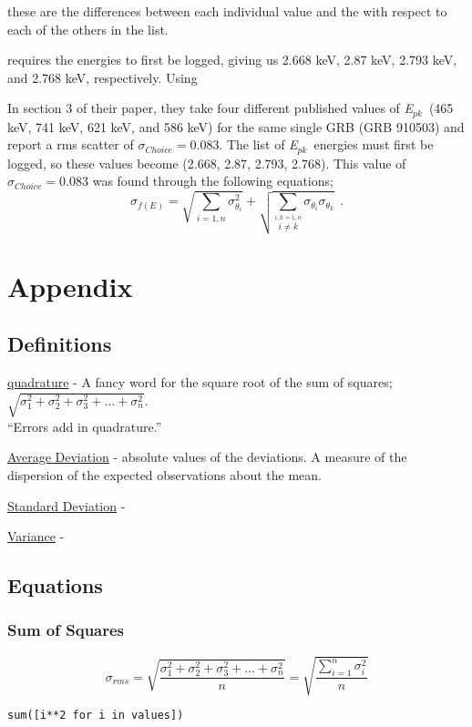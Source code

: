 \documentclass[11pt, oneside]{article}   	%
\newcommand{\epeak}{\textit{E$_{pk}$}}
\newcommand{\code}[1]{\texttt{#1}}  %
\begin{document}
these are the differences between each individual value and the with respect to each of the others in the list. 

requires the energies to first be logged, giving us 2.668 keV, 2.87 keV, 2.793 keV, and 2.768 keV, respectively. Using 






In section 3 of their paper, they take four different published values of \epeak \ (465 keV, 741 keV, 621 keV, and 586 keV) for the same single GRB (GRB 910503) and report a rms scatter of $\sigma_{Choice} = 0.083$. The list of \epeak \ energies must first be logged, so these values become (2.668, 2.87, 2.793, 2.768). This value of $\sigma_{Choice} = 0.083$ was found through the following equations;
\begin{equation}\label{eq:rms}
\sigma_{f(E)} = \sqrt{\sum_{i=1,n} \sigma_{\theta_i}^2}  + \sqrt{\sum_{\stackrel{i,k=1,n}{i \neq k}} \sigma_{\theta_i} \sigma_{\theta_k} } \ \ .
\end{equation}




\section{Appendix}
\subsection{Definitions}
\underline{quadrature} - A fancy word for the square root of the sum of squares; $\sqrt{\sigma_1^2 + \sigma_2^2 + \sigma_3^2 + ... + \sigma_n^2}$. \\
``Errors add in quadrature.''

\underline{Average Deviation} - absolute values of the deviations. A measure of the dispersion of the expected observations about the mean. 

\underline{Standard Deviation} - 

\underline{Variance} -



\subsection{Equations}

\subsubsection{Sum of Squares}
\begin{equation}
\sigma_{rms} = \sqrt{\frac{\sigma_1^2 + \sigma_2^2 + \sigma_3^2 + ... + \sigma_n^2}{n}} = \sqrt{\frac{\sum_{i=1}^n  \sigma_i^2}{n}} 
\end{equation}
\lstset{language=Python}
\begin{lstlisting}
sum([i**2 for i in values])
\end{lstlisting}
\end{document}
